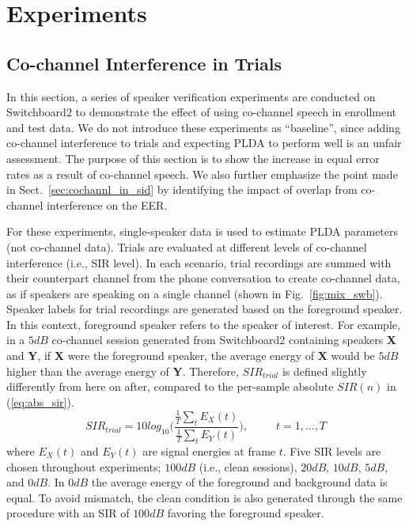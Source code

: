 \documentclass[journal]{IEEEtran}
\begin{document}
\section{Experiments}
\label{sec:exp}

\subsection{Co-channel Interference in Trials}

In this section, a series of speaker verification experiments are conducted on Switchboard2 to demonstrate the effect of using co-channel speech in enrollment and test data. 
We do not introduce these experiments as ``baseline'', since adding co-channel interference to trials and expecting PLDA to perform well is an unfair assessment. 
The purpose of this section is to show the increase in equal error rates as a result of co-channel speech. 
We also further emphasize the point made in Sect.~\ref{sec:cochannl_in_sid} by identifying the impact of overlap from co-channel interference on the EER. 

For these experiments, single-speaker data is used to estimate PLDA parameters (not co-channel data). 
Trials are evaluated at different levels of co-channel interference (i.e., SIR level). 
In each scenario, trial recordings are summed with their counterpart channel from the phone conversation to create co-channel data, as if speakers are speaking on a single channel (shown in Fig.~\ref{fig:mix_swb}). 
Speaker labels for trial recordings are generated based on the foreground speaker. 
In this context, foreground speaker refers to the speaker of interest. 
For example, in a $5dB$ co-channel session generated from Switchboard2 containing speakers {\bf X} and {\bf Y}, if {\bf X} were the foreground speaker, the average energy of {\bf X} would be $5dB$ higher than the average energy of {\bf Y}. 
Therefore, $SIR_{trial}$ is defined slightly differently from here on after, compared to the per-sample absolute $SIR(n)$ in (\ref{eq:abs_sir}). 
\begin{equation} 
SIR_{trial} = 10log_{10}\Big(\frac{\frac{1}{T}\sum_t E_X(t)}{\frac{1}{T}\sum_t E_Y(t)}\Big), \hspace{30pt} t=1,...,T
\end{equation}
where $E_X(t)$ and $E_Y(t)$ are signal energies at frame $t$. 
Five SIR levels are chosen throughout experiments; $100dB$ (i.e., clean sessions), $20dB$, $10dB$, $5dB$, and $0dB$. 
In $0dB$ the average energy of the foreground and background data is equal. 
To avoid mismatch, the clean condition is also generated through the same procedure with an SIR of $100dB$ favoring the foreground speaker. 
\end{document}
